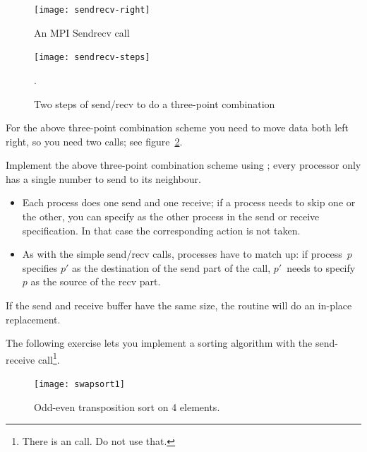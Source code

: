 \begin{figure}[ht]
  \texttt{[image: sendrecv-right]}
  \caption{An MPI Sendrecv call}
  \label{fig:sendrecv}
\end{figure}

\begin{figure}[ht]
  \texttt{[image: sendrecv-steps]}
  \caption{Two steps of send/recv to do a three-point combination}
  \label{fig:sendrecv-steps}.
\end{figure}

For the above three-point combination scheme you need to move data
both left right, so you need two  calls;
see figure~\ref{fig:sendrecv-steps}.

\begin{exercise}
  \label{ex:3ptsendrecv}
  Implement the above three-point combination scheme using ;
  every processor only has a single number to send to its neighbour.

\end{exercise}

\begin{itemize}
\item Each process does one send and one receive; if a process needs
  to skip one or the other, you can specify
   as the other process in the send or
  receive specification. In that case the corresponding action
  is not taken.
\item As with the simple send/recv calls, processes have to match up:
  if process~$p$ specifies $p'$ as the destination of the send part of
  the call, $p'$~needs to specify $p$ as the source of the recv part.
\end{itemize}

If the send and receive buffer have the same size, the routine
 will do an in-place replacement.

The following exercise lets you implement a sorting algorithm with the
send-receive call\footnote {There is an 
  call. Do not use that.}.

\begin{figure}[ht]
  \texttt{[image: swapsort1]}
  \caption{Odd-even transposition sort on 4 elements.}
  \label{fig:swapsort1}
\end{figure}


